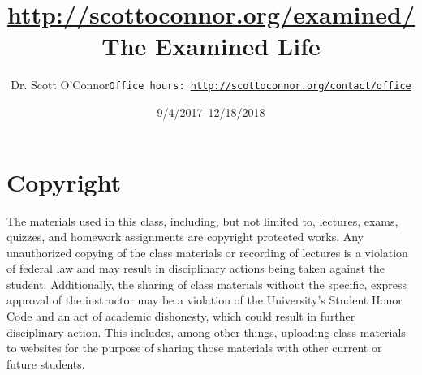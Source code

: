 \documentclass[article,oneside]{memoir}
\def\myauthor{Author}
\def\mytitle{Title}
\def\mycopyright{\myauthor}
\def\myweb{\href{http://scottoconnor.org/examined/}{http://scottoconnor.org/examined/}}
\def\myauthor{Dr. Scott O'Connor}
\def\mytitle{{\normalsize \myweb \newline} \HUGE The Examined Life}
\begin{document}
\setsansfont[Mapping=tex-text]{Myriad Pro} 
\setmonofont[Mapping=tex-text,Scale=0.8]{Georgia} 

\def\ind{\hangindent=1 true cm\hangafter=1 \noindent}
\def\labelitemi{$\cdot$}


\title{\LARGE \mytitle}     
\author{\Large\myauthor \newline \footnotesize\texttt{\noindent Office hours: \href{http://scottoconnor.org/contact/office}{http://scottoconnor.org/contact/office}}}
\date{9/4/2017--12/18/2018}


\maketitle




%
%

\section{Copyright}
The materials used in this class, including, but not limited to, lectures, exams, quizzes, and homework assignments are copyright protected works.  Any unauthorized copying of the class materials or recording of lectures is a violation of federal law and may result in disciplinary actions being taken against the student.  Additionally, the sharing of class materials without the specific, express approval of the instructor may be a violation of the University's Student Honor Code and an act of academic dishonesty, which could result in further disciplinary action.  This includes, among other things, uploading class materials to websites for the purpose of sharing those materials with other current or future students. 
\end{document}
